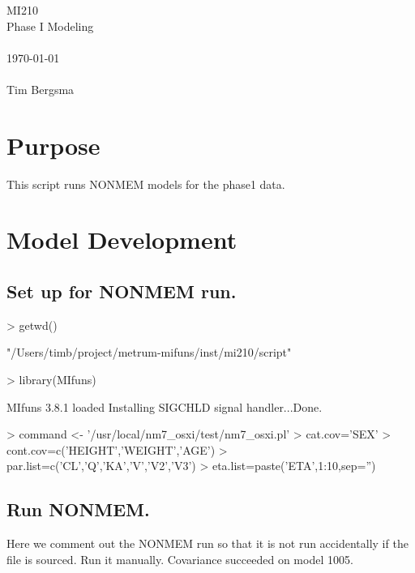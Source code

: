 
\usepackage{Sweave}

 

\vspace*{2cm}
\begin{center}
{\Huge MI210}\\
\vspace{1.5cm}
{\Large Phase I Modeling}\\
~\\
\today\\
~\\
Tim Bergsma\\
\end{center}
\newpage

\section{Purpose}
This script runs NONMEM models for the phase1 data.
\section{Model Development}
\subsection{Set up for NONMEM run.}
\begin{Schunk}
\begin{Sinput}
> getwd()
\end{Sinput}
\begin{Soutput}
[1] "/Users/timb/project/metrum-mifuns/inst/mi210/script"
\end{Soutput}
\begin{Sinput}
> library(MIfuns)
\end{Sinput}
\begin{Soutput}
MIfuns 3.8.1 loaded
Installing SIGCHLD signal handler...Done.
\end{Soutput}
\begin{Sinput}
> command <- '/usr/local/nm7_osxi/test/nm7_osxi.pl'
> cat.cov='SEX'
> cont.cov=c('HEIGHT','WEIGHT','AGE')
> par.list=c('CL','Q','KA','V','V2','V3')
> eta.list=paste('ETA',1:10,sep='')
\end{Sinput}
\end{Schunk}
\subsection{Run NONMEM.}
Here we comment out the NONMEM run so that it is not run accidentally 
if the file is sourced.  Run it manually.
Covariance succeeded on model 1005.
